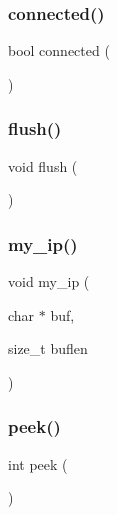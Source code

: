 \subsubsection{\texorpdfstring{connected()}{connected()}}
{\footnotesize\ttfamily bool connected (\begin{DoxyParamCaption}{ }\end{DoxyParamCaption})}

\mbox{\label{class_esp_server_adac116554b543b7c4228c018a85882f5}} 
\subsubsection{\texorpdfstring{flush()}{flush()}}
{\footnotesize\ttfamily void flush (\begin{DoxyParamCaption}{ }\end{DoxyParamCaption})\hspace{0.3cm}{\ttfamily [virtual]}}

\mbox{\label{class_esp_server_a01953c4cc039c37f94dc3e1057126abb}} 
\subsubsection{\texorpdfstring{my\+\_\+ip()}{my\_ip()}}
{\footnotesize\ttfamily void my\+\_\+ip (\begin{DoxyParamCaption}\item[{char $\ast$}]{buf,  }\item[{size\+\_\+t}]{buflen }\end{DoxyParamCaption})}

\mbox{\label{class_esp_server_a9040fa1d479d71edf3a826f4691c35c4}} 
\subsubsection{\texorpdfstring{peek()}{peek()}}
{\footnotesize\ttfamily int peek (\begin{DoxyParamCaption}{ }\end{DoxyParamCaption})\hspace{0.3cm}{\ttfamily [virtual]}}

